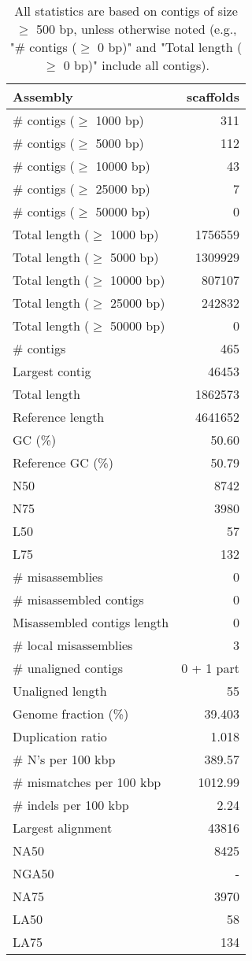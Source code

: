 \documentclass[12pt,a4paper]{article}
\begin{document}
\begin{table}[ht]
\begin{center}
\caption{All statistics are based on contigs of size $\geq$ 500 bp, unless otherwise noted (e.g., "\# contigs ($\geq$ 0 bp)" and "Total length ($\geq$ 0 bp)" include all contigs).}
\begin{tabular}{|l*{1}{|r}|}
\hline
Assembly & scaffolds \\ \hline
\# contigs ($\geq$ 1000 bp) & 311 \\ \hline
\# contigs ($\geq$ 5000 bp) & 112 \\ \hline
\# contigs ($\geq$ 10000 bp) & 43 \\ \hline
\# contigs ($\geq$ 25000 bp) & 7 \\ \hline
\# contigs ($\geq$ 50000 bp) & 0 \\ \hline
Total length ($\geq$ 1000 bp) & 1756559 \\ \hline
Total length ($\geq$ 5000 bp) & 1309929 \\ \hline
Total length ($\geq$ 10000 bp) & 807107 \\ \hline
Total length ($\geq$ 25000 bp) & 242832 \\ \hline
Total length ($\geq$ 50000 bp) & 0 \\ \hline
\# contigs & 465 \\ \hline
Largest contig & 46453 \\ \hline
Total length & 1862573 \\ \hline
Reference length & 4641652 \\ \hline
GC (\%) & 50.60 \\ \hline
Reference GC (\%) & 50.79 \\ \hline
N50 & 8742 \\ \hline
N75 & 3980 \\ \hline
L50 & 57 \\ \hline
L75 & 132 \\ \hline
\# misassemblies & 0 \\ \hline
\# misassembled contigs & 0 \\ \hline
Misassembled contigs length & 0 \\ \hline
\# local misassemblies & 3 \\ \hline
\# unaligned contigs & 0 + 1 part \\ \hline
Unaligned length & 55 \\ \hline
Genome fraction (\%) & 39.403 \\ \hline
Duplication ratio & 1.018 \\ \hline
\# N's per 100 kbp & 389.57 \\ \hline
\# mismatches per 100 kbp & 1012.99 \\ \hline
\# indels per 100 kbp & 2.24 \\ \hline
Largest alignment & 43816 \\ \hline
NA50 & 8425 \\ \hline
NGA50 & - \\ \hline
NA75 & 3970 \\ \hline
LA50 & 58 \\ \hline
LA75 & 134 \\ \hline
\end{tabular}
\end{center}
\end{table}
\end{document}
